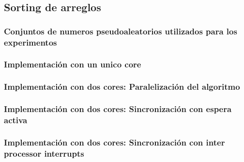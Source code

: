 \subsection{Sorting de arreglos}
    \subsubsection{Conjuntos de numeros pseudoaleatorios utilizados para los experimentos}
    \subsubsection{Implementación con un unico core}
    \subsubsection{Implementación con dos cores: Paralelización del algoritmo}
    \subsubsection{Implementación con dos cores: Sincronización con espera activa}
    \subsubsection{Implementación con dos cores: Sincronización con inter processor interrupts}
    